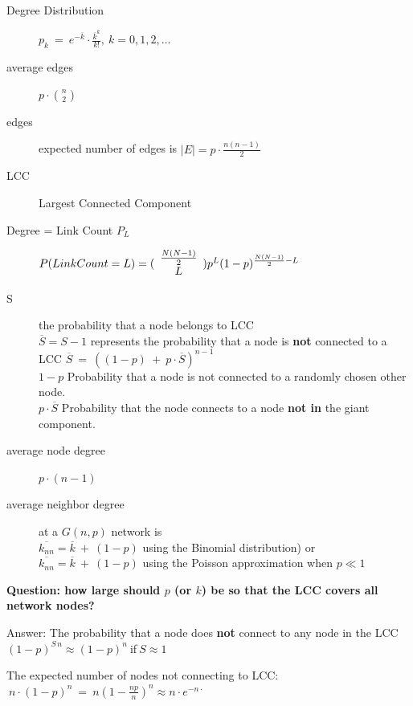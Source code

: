 \documentclass[crop=false]{standalone}
\begin{document}
\begin{description}
    \item [Degree Distribution]  $p_k\:=\:e^{-\overline{k}}\cdot{\frac{\overline{k}^{k}}{k!}},\:k=0,1,2,\dots$
    \item [average edges] $p\cdot{\binom{n}{2}}$
    \item [edges] expected number of edges is  $|E|=p\cdot\frac{n(n-1)}{2}$
    \item[LCC] Largest Connected Component
    \item[Degree = Link Count $P_L$]  $ P(Link Count = L) =( {\begin{array}{*{20}c} {\frac{{N(N - 1)}}{2}}  \\ L  \\ \end{array}} )p^L (1 - p)^{\frac{{N(N - 1)}}{2} - L}$
    \item [S] the probability that a node belongs to LCC\\
    $\overline{S} = S-1$ represents the probability that a node is \textbf{not} connected to a LCC
    $\overline{S}\:=\:((1-p)\:+\:p\cdot\overline{S})^{n-1}$\\
    $1-p$   Probability that a node is not connected to a randomly chosen other node.\\
    $p\cdot\overline{S}$ Probability that the node connects to a node \textbf{not in} the giant component.
    \item [average node degree] $p \cdot (n-1) $
    \item [average neighbor degree] at a $G(n,p)$ network is\\
    $\overline{k_{nn}}=\overline{k}\:+\:(1-p)$ using the Binomial distribution) or\\
    $\overline{k_{nn}}=\overline{k}\:+\:(1-p)$ using the Poisson approximation when $p\ll1$
\end{description}
\textbf{Question: how large should $p$ (or $k$) be so that the LCC covers all network nodes?}

Answer: The probability that a node does \textbf{not} connect to any node in the LCC $(1-p)^{S \, n}\approx(1-p)^n\:$if$\:S\approx1$

The expected number of nodes not connecting to LCC:
$\:n\cdot(1-p)^n\:=\:n(1-\frac{np}{n})^n\approx n\cdot e^{-n\cdotp}$
\end{document}
